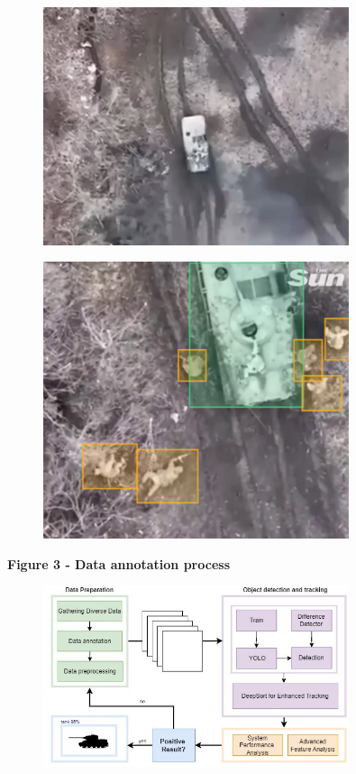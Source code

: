 \begin{figure}[H]
	\centering
	\includegraphics[width=0.8\textwidth]{assets/13}
	\caption*{}
\end{figure}\begin{figure}[H]
	\centering
	\includegraphics[width=0.8\textwidth]{assets/14}
	\caption*{}
\end{figure}

{\bfseries Figure 3 - Data annotation process}

\begin{figure}[H]
	\centering
	\includegraphics[width=0.8\textwidth]{assets/15}
	\caption*{}
\end{figure}

